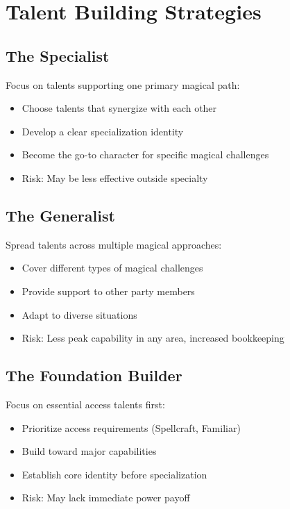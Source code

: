\documentclass[11pt,twoside,openany]{book}
\begin{document}
\section*{Talent Building Strategies} 

\subsection*{The Specialist}

Focus on talents supporting one primary magical path:
\begin{itemize}
\item Choose talents that synergize with each other
\item Develop a clear specialization identity
\item Become the go-to character for specific magical challenges
\item Risk: May be less effective outside specialty
\end{itemize}

\subsection*{The Generalist}

Spread talents across multiple magical approaches:
\begin{itemize}
\item Cover different types of magical challenges
\item Provide support to other party members
\item Adapt to diverse situations
\item Risk: Less peak capability in any area, increased bookkeeping
\end{itemize}

\subsection*{The Foundation Builder}

Focus on essential access talents first:
\begin{itemize}
\item Prioritize access requirements (Spellcraft, Familiar)
\item Build toward major capabilities
\item Establish core identity before specialization
\item Risk: May lack immediate power payoff
\end{itemize}
\end{document}
